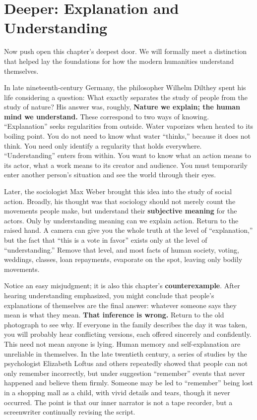 \section{Deeper: Explanation and Understanding}
Now push open this chapter's deepest door. We will formally meet a distinction that helped lay the foundations for how the modern humanities understand themselves.

In late nineteenth-century Germany, the philosopher Wilhelm Dilthey spent his life considering a question: What exactly separates the study of people from the study of nature? His answer was, roughly, \textbf{Nature we explain; the human mind we understand.} These correspond to two ways of knowing. ``Explanation'' seeks regularities from outside. Water vaporizes when heated to its boiling point. You do not need to know what water ``thinks,'' because it does not think. You need only identify a regularity that holds everywhere. ``Understanding'' enters from within. You want to know what an action means to its actor, what a work means to its creator and audience. You must temporarily enter another person's situation and see the world through their eyes.

Later, the sociologist Max Weber brought this idea into the study of social action. Broadly, his thought was that sociology should not merely count the movements people make, but understand their \textbf{subjective meaning} for the actors. Only by understanding meaning can we explain action. Return to the raised hand. A camera can give you the whole truth at the level of ``explanation,'' but the fact that ``this is a vote in favor'' exists only at the level of ``understanding.'' Remove that level, and most facts of human society, voting, weddings, classes, loan repayments, evaporate on the spot, leaving only bodily movements.

Notice an easy misjudgment; it is also this chapter's \textbf{counterexample}. After hearing understanding emphasized, you might conclude that people's explanations of themselves are the final answer: whatever someone says they mean is what they mean. \textbf{That inference is wrong.} Return to the old photograph to see why. If everyone in the family describes the day it was taken, you will probably hear conflicting versions, each offered sincerely and confidently. This need not mean anyone is lying. Human memory and self-explanation are unreliable in themselves. In the late twentieth century, a series of studies by the psychologist Elizabeth Loftus and others repeatedly showed that people can not only remember incorrectly, but under suggestion ``remember'' events that never happened and believe them firmly. Someone may be led to ``remember'' being lost in a shopping mall as a child, with vivid details and tears, though it never occurred. The point is that our inner narrator is not a tape recorder, but a screenwriter continually revising the script.

